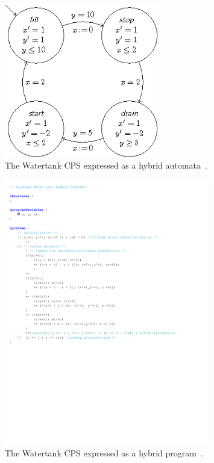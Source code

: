 \begin{figure}
	\centering
	\includegraphics[width=0.6\textwidth]{images/watertank_ha}
	\caption{The Watertank CPS expressed as a hybrid automata~\cite{keymaeraGuide}.}
	\label{fig:watertank_ha}
\end{figure}

\begin{figure}
	\centering
	\includegraphics[width=0.8\textwidth]{images/watertank_hp}
	\caption{The Watertank CPS expressed as a hybrid program~\cite{keymaeraGuide}.}
	\label{fig:watertank_hp}
\end{figure}

